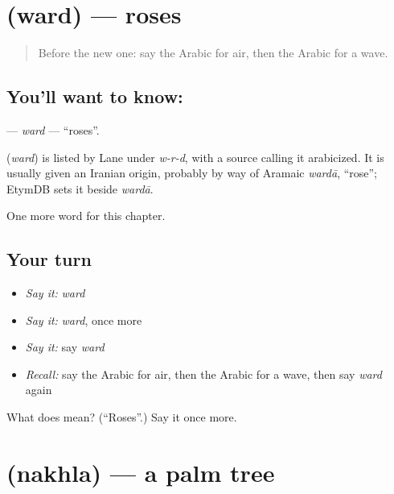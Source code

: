 \section[\texorpdfstring{\ar{ورد} (ward)}{ورد (ward)}]{ (ward) — roses}

\label{lesson:AR-C247-ward}



\begin{quote}
Before the new one: say the Arabic for air, then the Arabic for a wave.
\end{quote}

\subsection*{You'll want to know: }
\textbf{} — \emph{ward} — \textquotedblleft{}roses\textquotedblright{}.

\begin{cousinweb}
\textbf{} (\emph{ward}) is listed by Lane under \emph{w-r-d}, with a source calling it arabicized. It is usually given an Iranian origin, probably by way of Aramaic \emph{wardā}, \textquotedblleft{}rose\textquotedblright{}; EtymDB sets it beside \emph{wardā}.
\end{cousinweb}

\begin{grammarlens}[title={What you've built}]
One more word for this chapter.
\end{grammarlens}

\subsection*{Your turn}
\begin{itemize}
\raggedright
  \item \emph{Say it:} \emph{ward}
  \item \emph{Say it:} \emph{ward}, once more
  \item \emph{Say it:} say \emph{ward}
  \item \emph{Recall:} say the Arabic for air, then the Arabic for a wave, then say \emph{ward} again
\end{itemize}

\begin{tcolorbox}[breakable,colback=teal!4,colframe=teal!35!black,title={Before you move on}]
What does  mean? (\textquotedblleft{}Roses\textquotedblright{}.) Say it once more.
\end{tcolorbox}
\section[\texorpdfstring{\ar{نخلة} (nakhla)}{نخلة (nakhla)}]{ (nakhla) — a palm tree}

